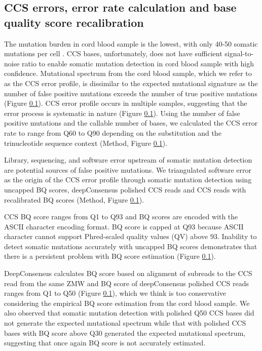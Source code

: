 \subsection{CCS errors, error rate calculation and base quality score recalibration}

The mutation burden in cord blood sample is the lowest, with only 40-50 somatic mutations per cell \cite{}. CCS bases, unfortunately, does not have sufficient signal-to-noise ratio to enable somatic mutation detection in cord blood sample with high confidence. Mutational spectrum from the cord blood sample, which we refer to as the CCS error profile, is dissimilar to the expected mutational signature as the number of false positive mutations exceeds the number of true positive mutations (Figure \ref{}). CCS error profile occurs in multiple samples, suggesting that the error process is systematic in nature (Figure \ref{}). Using the number of false positive mutations and the callable number of bases, we calculated the CCS error rate to range from Q60 to Q90 depending on the substitution and the trinucleotide sequence context (Method, Figure \ref{}). 

Library, sequencing, and software error upstream of somatic mutation detection are potential sources of false positive mutations. We triangulated software error as the origin of the CCS error profile through somatic mutation detection using uncapped BQ scores, deepConsensus polished CCS reads \cite{} and CCS reads with recalibrated BQ scores (Method, Figure \ref{}). 

CCS BQ score ranges from Q1 to Q93 and BQ scores are encoded with the ASCII character encoding format. BQ score is capped at Q93 because ASCII character cannot support Phred-scaled quality values (QV) above 93. Inability to detect somatic mutations accurately with uncapped BQ scores demonstrates that there is a persistent problem with BQ score estimation (Figure \ref{}). 

DeepConsensus calculates BQ score based on alignment of subreads to the CCS read from the same ZMW and BQ score of deepConsensus polished CCS reads ranges from Q1 to Q50 (Figure \ref{}), which we think is too conservative considering the empirical BQ score estimation from the cord blood sample. We also observed that somatic mutation detection with polished Q50 CCS bases did not generate the expected mutational spectrum while that with polished CCS bases with BQ score above Q30 generated the expected mutational spectrum, suggesting that once again BQ score is not accurately estimated. 

